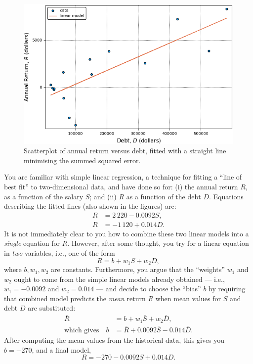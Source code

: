 \documentclass[11pt, reqno]{amsart} \usepackage{hyperlatex}
\begin{document}
\begin{figure}
\includegraphics[scale=0.6]{model2.png}
\caption{Scatterplot of annual return versus debt, fitted with a
  straight line minimising the summed squared error.}
      \label{fig:2}
\end{figure}

You are familiar with simple linear regression, a technique for
fitting a ``line of best fit'' to two-dimensional data, and have done
so for: (i) the annual return $R$, as a function of the salary $S$;
and (ii) $R$ as a function of the debt $D$. Equations describing the
fitted lines (also shown in the figures) are:
\begin{align*}
  R &= 2\,220 - 0.0092 S, \\
  R &= -1\,120 + 0.014 D. 
\end{align*}
It is not immediately clear to you how to combine these two linear
models into a {\em single} equation for $R$. However, after some
thought, you try for a linear equation in {\em two} variables, i.e.,
one of the form
\begin{equation}
  \label{eq:1}
  R = b + w_1 S  + w_2 D,
\end{equation}
where $b,w_1,w_2$ are constants. Furthermore, you argue that the
``weights'' $w_1$ and $w_2$ ought to come from the simple linear
models already obtained --- i.e., $w_1 = -0.0092$ and $w_2=0.014$ ---
and decide to choose the ``bias'' $b$ by requiring that combined model
predicts the {\em mean} return $\bar R$ when mean values for $S$ and
debt $D$ are substituted:
\begin{align*}
  \bar R &= b + w_1 {\bar S} + w_2 {\bar D},\\
  \text{which gives}\quad b &= {\bar R} + 0.0092 {\bar S} - 0.014
  {\bar D}.
\end{align*}
After computing the mean values from the historical data, this gives
you $b= -270$, and a final model,
\begin{equation}
  \label{eq:2}
  R = -270 -0.0092 S + 0.014 D.
\end{equation}
\end{document}
